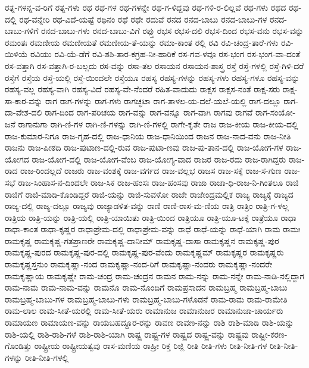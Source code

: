 {ರತ್ನ-ಗಳನ್ನ-ವ-ರಿಗೆ
ರತ್ನ-ಗಳು
ರಥ
ರಥ-ಗಳ
ರಥ-ಗಳನ್ನೇ
ರಥ-ಗ-ಳಿದ್ದವು
ರಥ-ಗಳಿ-ರ-ಲಿಲ್ಲವೆ
ರಥ-ಗಳು
ರಥದ
ರಥ-ದಲ್ಲಿ
ರಥ-ವನ್ನೇರಿ
ರಥ-ವಿದೆ-ಯಷ್ಟೆ
ರಥಿನಂ
ರಥೆ
ರಥೇ
ರದುವೆ
ರನದ
ರನದ-ಬಾಬು
ರನದ-ಬಾಬು-ಗಳ
ರನದ-ಬಾಬು-ಗಳಿಗೆ
ರನದ-ಬಾಬು-ಗಳು
ರನದ-ಬಾಬು-ವಿಗೆ
ರಫ್ತು
ರಭಸ
ರಭಸ-ದಲಿ
ರಭಸ-ದಿಂದ
ರಭಸ-ವನು
ರಭಸ-ವನ್ನು
ರಮಂತಃ
ರಮಣೀಯ
ರಮಣೀಯತೆ
ರಮಣೀಯ-ತೆ-ಯನ್ನು
ರಮಾ-ಕಾಂತ
ರಲ್ಲಿ
ರವಿ
ರವಿ-ಚಂದ್ರ-ತಾರೆ-ಗಳು
ರವಿ-ಯಿಳಿಯೆ
ರವಿಯು
ರವಿ-ಯೆ-ಡೆಗೆ
ರವಿ-ಶಶಿ-ತಾರ-ಕಗ್ರಹ-ನೀ-ಹಾರಿಕೆ
ರಸ-ಗವ-ಳವೂ
ರಸ-ಭಂಗ
ರಸ-ಭಂಗ-ವಾ-ದಂತೆ
ರಸ-ವತ್ತಾಗಿ
ರಸ-ವತ್ತಾಗಿ-ರ-ಬಲ್ಲದು
ರಸ-ವನ್ನು
ರಸಾ-ತಲ
ರಸಾಯನ
ರಸಾಯನ-ಶಾಸ್ತ್ರ
ರಸ್ತೆ
ರಸ್ತೆ-ಗಳಲ್ಲಿ
ರಸ್ತೆ-ಗಿಳಿ-ದರೆ
ರಸ್ತೆಗೆ
ರಸ್ತೆಯ
ರಸ್ತೆ-ಯಲ್ಲಿ
ರಸ್ತೆ-ಯಿಂದಲೇ
ರಸ್ತೆಯೂ
ರಹಸ್ಯ
ರಹಸ್ಯ-ಗಳನ್ನು
ರಹಸ್ಯ-ಗಳು
ರಹಸ್ಯ-ಗಳೂ
ರಹಸ್ಯ-ವನ್ನು
ರಹಸ್ಯ-ವಲ್ಲ
ರಹಸ್ಯ-ವಾಗಿ
ರಹಸ್ಯ-ವಿದೆ
ರಹಸ್ಯ-ವೇ-ನೆಂದರೆ
ರಹಿತ-ವಾದುದು
ರಾಕ್ಷಸ
ರಾಕ್ಷಸ-ನಂತೆ
ರಾಕ್ಷ-ಸರು
ರಾಕ್ಷ-ಸಾ-ಕಾರ-ವನ್ನು
ರಾಗ
ರಾಗ-ಗಳನ್ನು
ರಾಗ-ಗಳು
ರಾಗಚ್ಛಟಾ
ರಾಗ-ತಾಳಲ-ಯ-ದಲೆ-ಯಲೆ-ಯಲ್ಲಿ
ರಾಗ-ದಲ್ಲೂ
ರಾಗ-ದಾ-ವೇಶ-ದಲಿ
ರಾಗ-ದಿಂದ
ರಾಗ-ಪರಿಚಯ
ರಾಗ-ವನ್ನು
ರಾಗ-ವನ್ನೂ
ರಾಗ-ವಾಗಿ
ರಾಗವು
ರಾಗವೆ
ರಾಗ-ಸಂಯೋ-ಜನೆ
ರಾಗಾನುಗಾ
ರಾಗಿ-ಣಿ-ಗಳ
ರಾಗಿ-ಣಿ-ಗಳನ್ನು
ರಾಗಿ-ಣಿ-ಗಳಲ್ಲಿ
ರಾಗೇ-ಕೃತೇ
ರಾಜ
ರಾಜ-ಕೀಯ
ರಾಜ-ಕೀಯ-ದಲ್ಲಿ
ರಾಜ-ಕುಮಾರ-ನಿಗೂ
ರಾಜ-ಗೃಹ-ದಲ್ಲಿ
ರಾಜ-ಧಾನಿಯ
ರಾಜ-ಧಾನಿಯಿಂದ
ರಾಜನ
ರಾಜ-ನಾದ-ವನು
ರಾಜ-ನೀತಿ
ರಾಜನು
ರಾಜ-ಪೀಠದಿ
ರಾಜ-ಪುಟಾಣ-ದಲ್ಲಿ-ರುವ
ರಾಜ-ಪುಟಾ-ಣವು
ರಾಜ-ಪು-ತಾನ-ದಲ್ಲಿ
ರಾಜ-ಯೋಗ-ಗಳ
ರಾಜ-ಯೋಗದ
ರಾಜ-ಯೋಗ-ದಲ್ಲಿ
ರಾಜ-ಯೋಗ-ವೆಂಬ
ರಾಜ-ಯೋಗ್ಯ-ವಾದ
ರಾಜರ
ರಾಜ-ರದು
ರಾಜ-ರಾಗಿದ್ದರು
ರಾಜ-ರಾದ
ರಾಜ-ರಿಂದಲ್ಲದೆ
ರಾಜರು
ರಾಜ-ವಂಶಕ್ಕೆ
ರಾಜ-ವರ್ಗದ
ರಾಜ-ವಲ್ಲಭ
ರಾಜಸ
ರಾಜ-ಸಕ್ಕೆ
ರಾಜ-ಸ-ಗುಣ
ರಾಜ-ಸಭೆ
ರಾಜ-ಸಿಂಹಾಸ-ನ-ದಿಂದಲೇ
ರಾಜ-ಸಿಕ
ರಾಜ-ಹಂಸಃ
ರಾಜ-ಹಂಸವು
ರಾಜಾ
ರಾಜಾ-ಧಿ-ರಾಜ-ನಿ-ಗಿಂತಲೂ
ರಾಜಿ
ರಾಜಿಗೆ
ರಾಜಿ-ಮಾಡಿ-ಕೊಂಡಿದ್ದರೆ
ರಾಜಿ-ಯನ್ನು
ರಾಜಿ-ಸುವಳೋ
ರಾಜೇ
ರಾಜೇಂದ್ರಮಲ್ಲಿಕ
ರಾಜ್ಯ
ರಾಜ್ಯಕ್ಕೆ
ರಾಜ್ಯದ
ರಾಜ್ಯ-ದಲ್ಲಿ
ರಾಜ್ಯ-ದಲ್ಲೂ
ರಾಜ್ಯವು
ರಾಜ್ಯಾಡಳಿತ-ವನ್ನು
ರಾಣಿ
ರಾಣಿ-ರಾಸ-ಮ-ಣಿಯ
ರಾತ್ರಿ
ರಾತ್ರಿಂ
ರಾತ್ರಿ-ಗ-ಳಲ್ಲ
ರಾತ್ರಿಯ
ರಾತ್ರಿ-ಯನ್ನು
ರಾತ್ರಿ-ಯಲ್ಲಿ
ರಾತ್ರಿ-ಯಾಯಿತು
ರಾತ್ರಿ-ಯಿಂದ
ರಾತ್ರಿಯೂ
ರಾತ್ರಿ-ಯೂ-ಟಕ್ಕೆ
ರಾತ್ರೆಯೂ
ರಾಧಾ
ರಾಧಾ-ಕಾಂತ
ರಾಧಾ-ಕೃಷ್ಣರ
ರಾಧಾಪ್ರೇಮ-ದಲ್ಲಿ
ರಾಧಾಪ್ರೇಮ-ವನ್ನು
ರಾಧೆ
ರಾಧೆ-ಯನ್ನು
ರಾಧೆ-ಯಾಗಿ
ರಾಮ
ರಾಮಃ
ರಾಮಕೃಷ್ಣ
ರಾಮಕೃಷ್ಣ-ಗತಪ್ರಾಣರೇ
ರಾಮಕೃಷ್ಣ-ದಾನೀಮ್
ರಾಮಕೃಷ್ಣ-ದಾಸಾ
ರಾಮಕೃಷ್ಣನ
ರಾಮಕೃಷ್ಣ-ಪುರ
ರಾಮಕೃಷ್ಣ-ಪುರದ
ರಾಮಕೃಷ್ಣ-ಪುರ-ದಲ್ಲಿ
ರಾಮಕೃಷ್ಣ-ಪುರ-ವೆಂದು
ರಾಮಕೃಷ್ಣಮ್
ರಾಮಕೃಷ್ಣರ
ರಾಮಕೃಷ್ಣರು
ರಾಮಕೃಷ್ಣಸ್ತನುಂ
ರಾಮಕೃಷ್ಣಾ-ನಂದ
ರಾಮಕೃಷ್ಣಾ-ನಂದ-ರಿಗೆ
ರಾಮಕೃಷ್ಣಾ-ನಂದರು
ರಾಮಕೃಷ್ಣಾ-ನಂದರೇ
ರಾಮಕೃಷ್ಣಾಯ
ರಾಮಕೃಷ್ಣೇ
ರಾಮ-ಚಂದ್ರ
ರಾಮ-ಚಂದ್ರನ
ರಾಮನ
ರಾಮ-ನನ್ನು
ರಾಮ-ನನ್ನೇ
ರಾಮ-ನಾಡಿ-ನಲ್ಲಿದ್ದಾಗ
ರಾಮ-ನಾಮ
ರಾಮ-ನಾಮ-ವನ್ನು
ರಾಮನೊ
ರಾಮ-ನೊಂದಿಗೆ
ರಾಮಪ್ರಸಾದನ
ರಾಮಬ್ರಹ್ಮ
ರಾಮಬ್ರಹ್ಮ-ಬಾಬು
ರಾಮಬ್ರಹ್ಮ-ಬಾಬು-ಗಳ
ರಾಮಬ್ರಹ್ಮ-ಬಾಬು-ಗಳು
ರಾಮಬ್ರಹ್ಮ-ಬಾಬು-ಗಳೊಡನೆ
ರಾಮ-ರಾಮ
ರಾಮ-ರಾಮೇತಿ
ರಾಮ-ಲಾಲ
ರಾಮ-ಸೀತೆ-ಯರಲ್ಲಿ
ರಾಮ-ಸೀತೆ-ಯರು
ರಾಮಾನುಜ
ರಾಮಾನುಜರ
ರಾಮಾನುಜಾ-ಚಾರ್ಯರು
ರಾಮಾಯಣ
ರಾಮಾಯಣ-ವನ್ನು
ರಾಯಬಹದ್ದೂರ-ರನ್ನು
ರಾವಣ
ರಾವಣ-ನನ್ನು
ರಾಶಿ
ರಾಶಿ-ಮಾಡಿ
ರಾಶಿ-ಯನ್ನು
ರಾಶಿ-ಯಲ್ಲಿ
ರಾಶಿ-ರಾಶಿ-ಗಳೆ
ರಾಶಿ-ರಾಶಿ-ಯಾಗಿ
ರಾಷ್ಟ್ರ
ರಾಷ್ಟ್ರ-ಗಳ
ರಾಷ್ಟ್ರದ
ರಾಷ್ಟ್ರ-ವನ್ನು
ರಾಷ್ಟ್ರವು
ರಾಷ್ಟ್ರೀ-ಕರಣ-ಗೊಂಡಿತ್ತು
ರಾಷ್ಟ್ರೀಯ
ರಾಷ್ಟ್ರೀಯತ್ವವು
ರಾಸ-ಮಣಿಯ
ರಾಹ್ರೀ
ರಿಕ್ತ
ರಿಜ್ಲಿ
ರೀತಿ
ರೀತಿ-ಗಳು
ರೀತಿ-ನೀತಿ-ಗಳ
ರೀತಿ-ನೀತಿ-ಗಳನ್ನು
ರೀತಿ-ನೀತಿ-ಗಳಲ್ಲಿ
}
